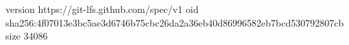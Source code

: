 version https://git-lfs.github.com/spec/v1
oid sha256:4f07013e3bc5ae3d6746b75cbc26da2a36eb40d86996582eb7bcd530792807cb
size 34086
